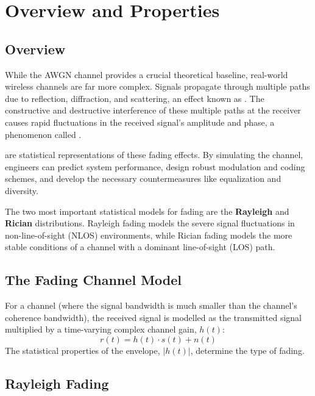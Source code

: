 \section{Overview and Properties}

\subsection{Overview}

While the AWGN channel provides a crucial theoretical baseline, real-world wireless channels are far more complex. Signals propagate through multiple paths due to reflection, diffraction, and scattering, an effect known as . The constructive and destructive interference of these multiple paths at the receiver causes rapid fluctuations in the received signal's amplitude and phase, a phenomenon called .

 are statistical representations of these fading effects. By simulating the channel, engineers can predict system performance, design robust modulation and coding schemes, and develop the necessary countermeasures like equalization and diversity.

\begin{keyconcept}
    The two most important statistical models for fading are the \textbf{Rayleigh} and \textbf{Rician} distributions. Rayleigh fading models the severe signal fluctuations in non-line-of-sight (NLOS) environments, while Rician fading models the more stable conditions of a channel with a dominant line-of-sight (LOS) path.
\end{keyconcept}


\subsection{The Fading Channel Model}

For a  channel (where the signal bandwidth is much smaller than the channel's coherence bandwidth), the received signal is modelled as the transmitted signal multiplied by a time-varying complex channel gain, $h(t)$:
\begin{equation}
    r(t) = h(t) \cdot s(t) + n(t)
\end{equation}
The statistical properties of the envelope, $|h(t)|$, determine the type of fading.


\subsection{Rayleigh Fading}

